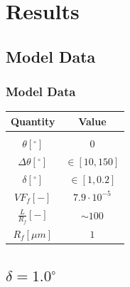 \documentclass[first,firstsupp,lastsupp,handout,last,hyperref,table]{ETHclass}
\begin{document}
\section{Results}

\subsection{Model Data}
\begin{frame}
\frametitle{Model Data}
\vspace{-0.5cm}
\centering

\begin{table}[htbp]

  \centering
    \begin{tabular}{cc}
    \textbf{Quantity}&\textbf{Value} \\[3pt]
    \midrule\\[12pt]
	$\theta \left[^{\circ}\right]$ & $0 $\\[1.5pt]
	$\Delta\theta \left[^{\circ}\right]$ & $\in\left[10,150\right] $\\[4pt]
	$\delta \left[^{\circ}\right]$ & $\in\left[1,0.2\right] $\\[3pt]
	$VF_{f} \left[-\right]$ & $7.9\cdot 10^{-5}$ \\[1.5pt]
	$\frac{L}{R_{f}} \left[-\right]$ & $\sim 100$ \\[3pt]
	$R_{f} \left[\mu m\right]$ & $1 $ \\[1.5pt]
    \end{tabular}%
  \label{tab:phaseprop}%
\end{table}%

\end{frame}


\subsection{$\delta=1.0^{\circ}$}
\end{document}

